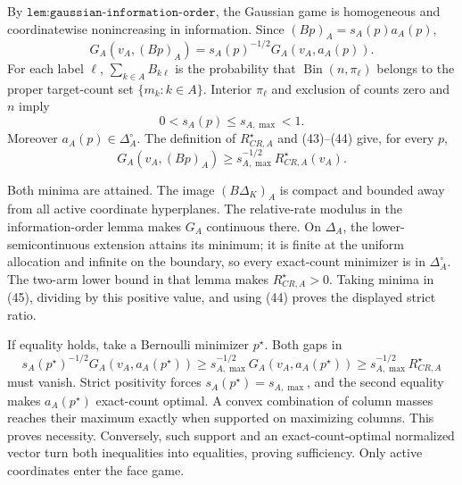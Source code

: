 By \(\texttt{lem:gaussian-information-order}\), the Gaussian game is homogeneous and coordinatewise nonincreasing in information.  Since \((Bp)_A=s_A(p)a_A(p)\),
\[
G_A(v_A,(Bp)_A)=s_A(p)^{-1/2}G_A(v_A,a_A(p)). \tag{43}
\]
For each label \(\ell\), \(\sum_{k\in A}B_{k\ell}\) is the probability that \(\operatorname{Bin}(n,\pi_\ell)\) belongs to the proper target-count set \(\{m_k:k\in A\}\).  Interior \(\pi_\ell\) and exclusion of counts zero and \(n\) imply
\[
0<s_A(p)\leq s_{A,\max}<1. \tag{44}
\]
Moreover \(a_A(p)\in\Delta_A^\circ\).  The definition of \(R_{CR,A}^\star\) and (43)--(44) give, for every \(p\),
\[
G_A(v_A,(Bp)_A)\geq s_{A,\max}^{-1/2}R_{CR,A}^\star(v_A). \tag{45}
\]

Both minima are attained.  The image \((B\Delta_K)_A\) is compact and bounded away from all active coordinate hyperplanes.  The relative-rate modulus in the information-order lemma makes \(G_A\) continuous there.  On \(\Delta_A\), the lower-semicontinuous extension attains its minimum; it is finite at the uniform allocation and infinite on the boundary, so every exact-count minimizer is in \(\Delta_A^\circ\).  The two-arm lower bound in that lemma makes \(R_{CR,A}^\star>0\).  Taking minima in (45), dividing by this positive value, and using (44) proves the displayed strict ratio.

If equality holds, take a Bernoulli minimizer \(p^\star\).  Both gaps in
\[
s_A(p^\star)^{-1/2}G_A(v_A,a_A(p^\star))
\geq s_{A,\max}^{-1/2}G_A(v_A,a_A(p^\star))
\geq s_{A,\max}^{-1/2}R_{CR,A}^\star
\]
must vanish.  Strict positivity forces \(s_A(p^\star)=s_{A,\max}\), and the second equality makes \(a_A(p^\star)\) exact-count optimal.  A convex combination of column masses reaches their maximum exactly when supported on maximizing columns.  This proves necessity.  Conversely, such support and an exact-count-optimal normalized vector turn both inequalities into equalities, proving sufficiency.  Only active coordinates enter the face game.